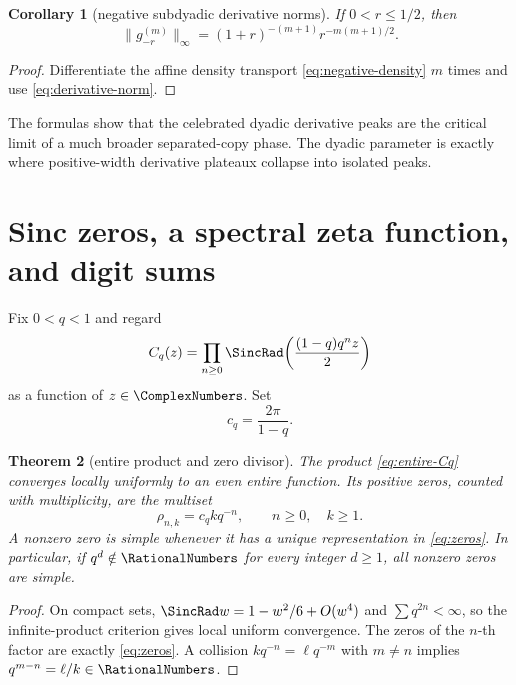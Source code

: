 \documentclass[11pt,oneside]{article}
\newtheorem{theorem}{Theorem}[section]
\newtheorem{corollary}[theorem]{Corollary}
\theoremstyle{definition}
\theoremstyle{remark}
\begin{document}
\begin{corollary}[negative subdyadic derivative norms]\label{cor:negative-derivative-norm}
If $0<r\le1/2$, then
\begin{equation}\label{eq:negative-derivative-norm}
 \|g_{-r}^{(m)}\|_\infty
 =(1+r)^{-(m+1)}r^{-m(m+1)/2}.
\end{equation}
\end{corollary}

\begin{proof}
Differentiate the affine density transport \cref{eq:negative-density} $m$ times and use \cref{eq:derivative-norm}.
\end{proof}

The formulas show that the celebrated dyadic derivative peaks are the critical limit of a much broader separated-copy phase.  The dyadic parameter is exactly where positive-width derivative plateaux collapse into isolated peaks.

\section{Sinc zeros, a spectral zeta function, and digit sums}
\label{sec:spectral}

Fix $0<q<1$ and regard
\begin{equation}\label{eq:entire-Cq}
 C_q(z)=\prod_{n\ge0}\SincRad\!\left(\frac{(1-q)q^nz}{2}\right)
\end{equation}
as a function of $z\in\ComplexNumbers$.  Set
\begin{equation}\label{eq:cq}
 c_q=\frac{2\pi}{1-q}.
\end{equation}

\begin{theorem}[entire product and zero divisor]\label{thm:zero-divisor}
The product \cref{eq:entire-Cq} converges locally uniformly to an even entire function.  Its positive zeros, counted with multiplicity, are the multiset
\begin{equation}\label{eq:zeros}
 \rho_{n,k}=c_qkq^{-n},
 \qquad n\ge0,\quad k\ge1.
\end{equation}
A nonzero zero is simple whenever it has a unique representation in \cref{eq:zeros}.  In particular, if $q^d\notin\RationalNumbers$ for every integer $d\ge1$, all nonzero zeros are simple.
\end{theorem}

\begin{proof}
On compact sets, $\SincRad w=1-w^2/6+O(w^4)$ and $\sum q^{2n}<\infty$, so the infinite-product criterion gives local uniform convergence.  The zeros of the $n$-th factor are exactly \cref{eq:zeros}.  A collision
$kq^{-n}=\ell q^{-m}$ with $m\ne n$ implies $q^{m-n}=\ell/k\in\RationalNumbers$.
\end{proof}
\end{document}

